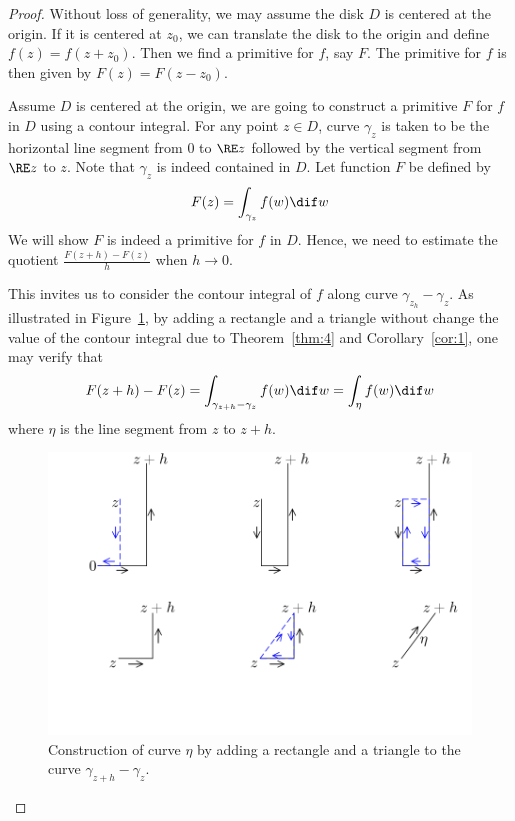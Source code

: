 \documentclass[thmcnt=section, color=cyan, 12pt]{my-elegantbook}
\begin{document}
\begin{proof}
    Without loss of generality, we may assume the disk $D$ is centered at the origin.
    If it is centered at $z_0$,
    we can translate the disk to the origin and define $f(z) = f(z + z_0)$.
    Then we find a primitive for $f$, say $F$.
    The primitive for $f$ is then given by $F(z) = F(z - z_0)$.

    Assume $D$ is centered at the origin,
    we are going to construct a primitive $F$ for $f$ in $D$
    using a contour integral.
    For any point $z \in D$,
    curve $\gamma_z$ is taken to be the horizontal line segment
    from $0$ to $\RE z$
    followed by the vertical segment from $\RE z$ to $z$.
    Note that $\gamma_z$ is indeed contained in $D$.
    Let function $F$ be defined by
    \begin{align*}
        F(z) = \int_{\gamma_z} f(w) \dif w
    \end{align*}
    We will show $F$ is indeed a primitive for $f$ in $D$.
    Hence, we need to estimate the quotient $\frac{F(z+h) - F(z)}{h}$ when $h \to 0$.

    This invites us to consider the contour integral of $f$ along curve $\gamma_{z_h} - \gamma_z$. As illustrated in Figure~\ref{fig:1},
    by adding a rectangle and a triangle without change the value of the contour integral
    due to Theorem~\ref{thm:4} and Corollary~\ref{cor:1}, one may verify that
    \begin{align}
        F(z+h) - F(z)
        = \int_{\gamma_{z+h} - \gamma_z} f(w) \dif w
        = \int_\eta f(w) \dif w
        \label{eq:6}
    \end{align}
    where $\eta$ is the line segment from $z$ to $z+h$.

    \begin{figure}[H]
        \centering
        \includegraphics[scale=0.3]{figures/adding-a-rectangle-and-a-triangle.png}
        \caption{Construction of curve $\eta$ by adding a rectangle and a triangle to the curve $\gamma_{z+h} - \gamma_z$.}
        \label{fig:1}
    \end{figure}


\end{proof}
\end{document}
